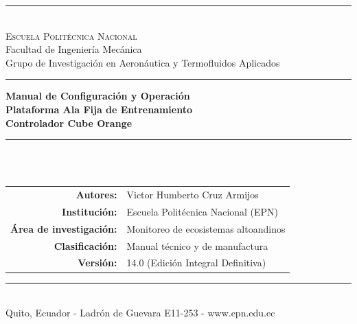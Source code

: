 \documentclass[11pt,a4paper]{article}
\begin{document}
\begin{titlepage}
    \centering\vspace*{0.5cm}
    \textcolor{epnblue}{\rule{\textwidth}{1pt}}\\[0.6cm]
    {\Large \textcolor{epnblue}{\textsc{Escuela Politécnica Nacional}}}\\[0.2cm]
    {\normalsize \textcolor{epnblue}{Facultad de Ingeniería Mecánica}}\\[0.1cm]
    {\normalsize \textcolor{epnblue}{Grupo de Investigación en Aeronáutica y Termofluidos Aplicados}}\\[0.5cm]
    \textcolor{epnblue}{\rule{\textwidth}{1pt}}\vspace{3.5cm}
    
    {\Large \bfseries \textcolor{epnblue}{Manual de Configuración y Operación}}\\[0.3cm]
    {\Large \bfseries \textcolor{epnblue}{Plataforma Ala Fija de Entrenamiento}}\\[0.3cm]
    {\Large \bfseries \textcolor{epnblue}{Controlador Cube Orange}}\\[1.5cm]
    \textcolor{epngold}{\rule{4cm}{1pt}}\\[1.5cm]
    \colorbox{epnblue}{}\\[2.5cm]
    
    \begin{table}[h]\centering\renewcommand{\arraystretch}{1.3}
        \begin{tabular}{rl}
            \textbf{Autores:} & Victor Humberto Cruz Armijos \\
            \textbf{Institución:} & Escuela Politécnica Nacional (EPN) \\
            \textbf{Área de investigación:} & Monitoreo de ecosistemas altoandinos \\
            \textbf{Clasificación:} & Manual técnico y de manufactura \\
            \textbf{Versión:} & 14.0 (Edición Integral Definitiva) \\
        \end{tabular}
    \end{table}\vfill
    \textcolor{epnblue}{\rule{\textwidth}{1pt}}\\[0.2cm]
    {\scriptsize Quito, Ecuador - Ladrón de Guevara E11-253 - www.epn.edu.ec}
\end{titlepage}
\end{document}
